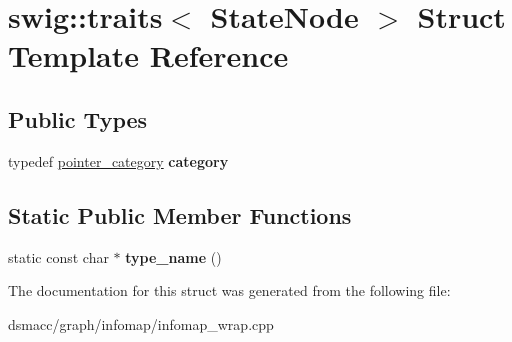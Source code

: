 \hypertarget{structswig_1_1traits_3_01StateNode_01_4}{}\section{swig\+:\+:traits$<$ State\+Node $>$ Struct Template Reference}
\label{structswig_1_1traits_3_01StateNode_01_4}
\subsection*{Public Types}
\begin{DoxyCompactItemize}
\item 
\mbox{\label{structswig_1_1traits_3_01StateNode_01_4_acf68d9e7e62259c217ed06f21da7ca26}} 
typedef \mbox{\hyperlink{structswig_1_1pointer__category}{pointer\+\_\+category}} {\bfseries category}
\end{DoxyCompactItemize}
\subsection*{Static Public Member Functions}
\begin{DoxyCompactItemize}
\item 
\mbox{\label{structswig_1_1traits_3_01StateNode_01_4_aa27c5ebbc5a93a1b08b12e38cc97f407}} 
static const char $\ast$ {\bfseries type\+\_\+name} ()
\end{DoxyCompactItemize}


The documentation for this struct was generated from the following file\+:\begin{DoxyCompactItemize}
\item 
dsmacc/graph/infomap/infomap\+\_\+wrap.\+cpp\end{DoxyCompactItemize}
